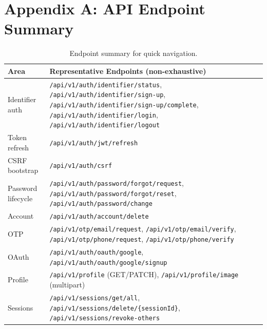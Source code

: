 \documentclass[11pt]{article}
\begin{document}
    \section{Appendix A: API Endpoint Summary}
    \begin{table}[H]
        \centering
        \footnotesize
        \begin{tabularx}{\textwidth}{@{}l>{\raggedright\arraybackslash}X@{}}
    \toprule
    \textbf{Area} & \textbf{Representative Endpoints (non-exhaustive)} \\
    \midrule
    Identifier auth & \nolinkurl{/api/v1/auth/identifier/status}, \nolinkurl{/api/v1/auth/identifier/sign-up}, \nolinkurl{/api/v1/auth/identifier/sign-up/complete}, \nolinkurl{/api/v1/auth/identifier/login}, \nolinkurl{/api/v1/auth/identifier/logout} \\
    Token refresh & \nolinkurl{/api/v1/auth/jwt/refresh} \\
    CSRF bootstrap & \nolinkurl{/api/v1/auth/csrf} \\
    Password lifecycle & \nolinkurl{/api/v1/auth/password/forgot/request}, \nolinkurl{/api/v1/auth/password/forgot/reset}, \nolinkurl{/api/v1/auth/password/change} \\
    Account & \nolinkurl{/api/v1/auth/account/delete} \\
    OTP & \nolinkurl{/api/v1/otp/email/request}, \nolinkurl{/api/v1/otp/email/verify}, \nolinkurl{/api/v1/otp/phone/request}, \nolinkurl{/api/v1/otp/phone/verify} \\
    OAuth & \nolinkurl{/api/v1/auth/oauth/google}, \nolinkurl{/api/v1/auth/oauth/google/signup} \\
    Profile & \nolinkurl{/api/v1/profile} (GET/PATCH), \nolinkurl{/api/v1/profile/image} (multipart) \\
    Sessions & \nolinkurl{/api/v1/sessions/get/all}, \nolinkurl{/api/v1/sessions/delete/\{sessionId\}}, \nolinkurl{/api/v1/sessions/revoke-others} \\
    \bottomrule
        \end{tabularx}
        \caption{Endpoint summary for quick navigation.}
        \label{tab:endpoints}
    \end{table}
\end{document}

